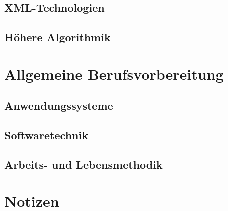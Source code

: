 \chapter{XML-Technologien}

\chapter{Höhere Algorithmik}



\part{Allgemeine Berufsvorbereitung}
\chapter{Anwendungssysteme}

\chapter{Softwaretechnik}

\chapter{Arbeits- und Lebensmethodik}



\part{Notizen}







